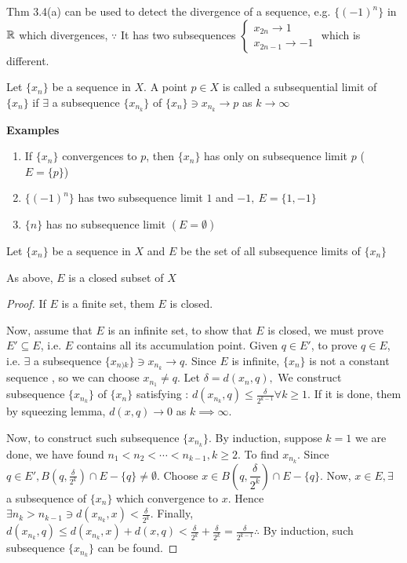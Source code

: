 \begin{rmk*}
		Thm 3.4(a) can be used to detect the divergence of a sequence, e.g. $\{(-1)^n\}$ in $\mathbb{R}$ which divergences, $\because$ It has two subsequences $\begin{cases}
			x_{2n} \rightarrow 1 \\ x_{2n - 1} \rightarrow -1
		\end{cases}$ which is different.
\end{rmk*}

\begin{defn}
	Let $\{x_n\}$ be a sequence in $X$. A point $p \in X$ is called a subsequential limit of $\{x_n\}$ if $\exists$ a subsequence $\{x_{n_k}\}$ of $\{x_n\} \ni x_{n_k} \rightarrow p$ as $k \rightarrow \infty$
\end{defn}

\textbf{Examples} 

\begin{enumerate}
	\item If $\{x_n\}$ convergences to $p$, then $\{x_n\}$ has only on subsequence limit $p$ ($E = \{p\}$)
	\item $\{(-1)^n\}$ has two subsequence limit $1$ and $-1,~ E = \{1,-1\}$
	\item $\{n\}$ has no subsequence limit $(E = \emptyset)$ 
\end{enumerate}

Let $\{x_n\}$ be a sequence in $X$ and $E$ be the set of all subsequence limits of $\{x_n\}$

\begin{thm}
	As above, $E$ is a closed subset of $X$
\end{thm}

\begin{proof}
	If $E$ is a finite set, them $E$ is closed.
	
	Now, assume that $E$ is an infinite set, to show that $E$ is closed, we must prove $E' \subseteq E$, i.e. $E$ contains all its accumulation point. Given $q \in E'$, to prove $q \in E$, i.e. $\exists$ a subsequence $\{x_{n)k}\} \ni x_{n_k} \rightarrow q$. Since $E$ is infinite, $\{x_n\}$ is not a constant sequence , so we can choose  $x_{n_1} \neq q$. Let $\delta = d(x_n , q),$ We construct subsequence $\{x_{n_k}\}$ of $\{x_n\}$ satisfying : $d(x_{n_k} , q) \leq \frac{\delta}{2^{k-1}} \forall k \geq 1$. If it is done, them by squeezing lemma, $d(x,q) \rightarrow 0$ as $k \implies \infty$. 
	
	Now, to construct such subsequence $\{x_{n_k}\}$. By induction, suppose $k = 1$ we are done, we have found $n_1 < n_2 < \cdots < n_{k-1} , k \geq 2$. To find $x_{n_k}$. Since $q \in E', B(q , \frac{\delta}{2^k}) \cap E - \{q\} \neq \emptyset$. Choose $x \in B(q,\dfrac{\delta}{2^k}) \cap E - \{q\}$. Now, $x \in E, \exists$ a subsequence of $\{x_n\}$ which convergence to $x$. Hence $\exists n_k > n_{k-1} \ni d(x_{n_k},x) < \frac{\delta}{2^k}$. Finally, $d(x_{n_k},q) \leq d(x_{n_k},x) + d(x,q) < \frac{\delta}{2^k} + \frac{\delta}{2^k} = \frac{\delta}{2^{k-1}} \therefore$ By induction, such subsequence $\{x_{n_k}\}$ can be found.
\end{proof}



